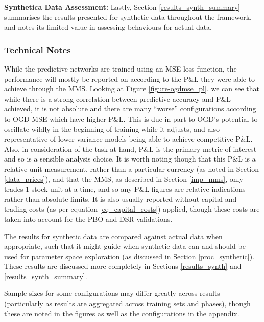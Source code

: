\documentclass[a4paper,11pt,oneside]{article}
\theoremstyle{plain}
\theoremstyle{definition}
\begin{document}
	\textbf{Synthetica Data Assessment:} Lastly, Section \ref{results_synth_summary} summarises the results presented for synthetic data throughout the framework, and notes its limited value in assessing behaviours for actual data.
	
	\subsubsection{Technical Notes}
	
	While the predictive networks are trained using an MSE loss function, the performance will mostly be reported on according to the P\&L they were able to achieve through the MMS. Looking at Figure \ref{figure-ogdmse_pl}, we can see that while there is a strong correlation between predictive accuracy and P\&L achieved, it is not absolute and there are many ``worse'' configurations according to OGD MSE which have higher P\&L. This is due in part to OGD's potential to oscillate wildly in the beginning of training while it adjusts, and also representative of lower variance models being able to achieve competitive P\&L. Also, in consideration of the task at hand, P\&L is the primary metric of interest and so is a sensible analysis choice. It is worth noting though that this P\&L is a relative unit measurement, rather than a particular currency (as noted in Section \ref{data_prices}), and that the MMS, as described in Section \ref{imp_mms}, only trades 1 stock unit at a time, and so any P\&L figures are relative indications rather than absolute limits. It is also usually reported without capital and trading costs (as per equation \eqref{eq_capital_costs}) applied, though these costs are taken into account for the PBO and DSR validations. \newline

	The results for synthetic data are compared against actual data when appropriate, such that it might guide when synthetic data can and should be used for parameter space exploration (as discussed in Section \ref{proc_synthetic}). These results are discussed more completely in Sections \ref{results_synth} and \ref{results_synth_summary}.\newline

	Sample sizes for some configurations may differ greatly across results (particularly as results are aggregated across training sets and phases), though these are noted in the figures as well as the configurations in the appendix.\newline
	
\end{document}
